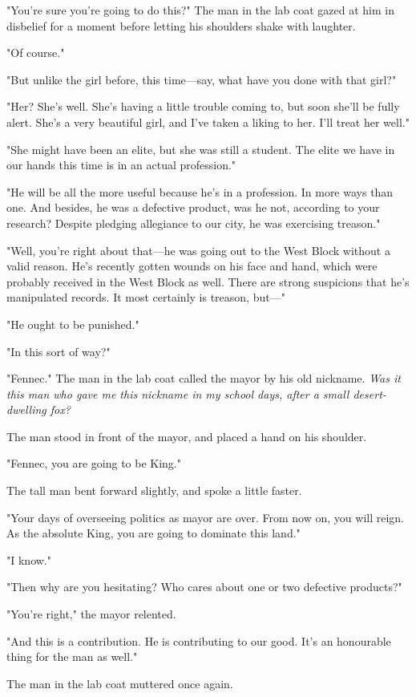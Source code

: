 "You're sure you're going to do this?" The man in the lab coat gazed at
him in disbelief for a moment before letting his shoulders shake with
laughter.

"Of course."

"But unlike the girl before, this time---say, what have you done with that
girl?"

"Her? She's well. She's having a little trouble coming to, but soon
she'll be fully alert. She's a very beautiful girl, and I've taken a
liking to her. I'll treat her well."

"She might have been an elite, but she was still a student. The elite we
have in our hands this time is in an actual profession."

"He will be all the more useful because he's in a profession. In more
ways than one. And besides, he was a defective product, was he not,
according to your research? Despite pledging allegiance to our city, he
was exercising treason."

"Well, you're right about that---he was going out to the West Block
without a valid reason. He's recently gotten wounds on his face and
hand, which were probably received in the West Block as well. There are
strong suspicions that he's manipulated records. It most certainly is
treason, but---"

"He ought to be punished."

"In this sort of way?"

"Fennec." The man in the lab coat called the mayor by his old nickname.
\emph{Was it this man who gave me this nickname in my school days, after a
small desert-dwelling fox?}

The man stood in front of the mayor, and placed a hand on his shoulder.

"Fennec, you are going to be King."

The tall man bent forward slightly, and spoke a little faster.

"Your days of overseeing politics as mayor are over. From now on, you
will reign. As the absolute King, you are going to dominate this land."

"I know."

"Then why are you hesitating? Who cares about one or two defective
products?"

"You're right," the mayor relented.

"And this is a contribution. He is contributing to our good. It's an
honourable thing for the man as well."

The man in the lab coat muttered once again.

